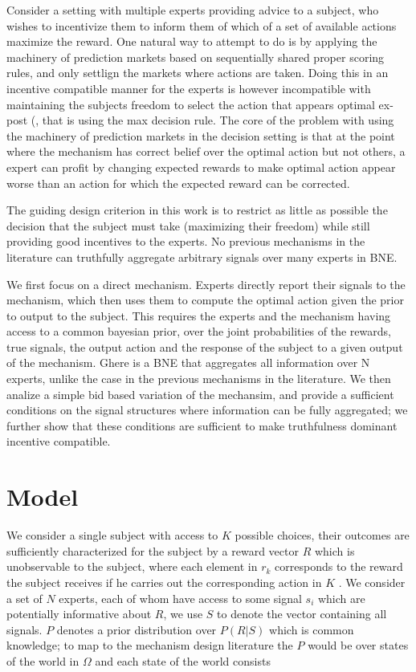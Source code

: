 
Consider a setting with multiple experts providing advice to a subject, who wishes to incentivize them to inform them of which of a set of available actions maximize the reward.
One natural way to attempt to do is by applying the machinery of prediction markets based on sequentially shared proper scoring rules, and only settlign the markets where actions are taken. Doing this in an incentive compatible manner for the experts is however incompatible with maintaining the subjects freedom to select the action that appears optimal ex-post (\cite{othman2010decision,  chen2014eliciting}, that is using the max decision rule. 
The core of the problem with using the machinery of prediction markets in the decision setting is that at the point where the mechanism has correct belief over the optimal action but not others, a expert  can profit by changing expected rewards to make optimal action appear worse than an action for which the expected reward can be corrected.


The guiding design criterion in this work is to restrict as little as possible the decision that the subject must take (maximizing their freedom) while still providing good incentives to the experts. No previous mechanisms in the literature can truthfully aggregate arbitrary signals over many experts in BNE. 

We first focus on a direct mechanism. Experts directly report their signals to the mechanism, which then uses them to compute the optimal action given the prior to output to the subject. This requires  the experts and the mechanism having access to a common bayesian prior, over the joint probabilities of the rewards, true signals, the output action and the response of the subject to a given output of the mechanism. Ghere is a BNE that aggregates all information over N experts, unlike the case in the previous mechanisms in the literature.
We then analize a simple bid based variation of the mechansim, and provide a sufficient conditions on the signal structures where information can be fully aggregated; we further show that these conditions are sufficient to make truthfulness dominant incentive compatible.  



\section{Model}

We consider a single subject with access to $K$ possible choices, their outcomes are sufficiently characterized for the subject by a reward vector $R$ which is unobservable to the subject, where each element in $r_k$ corresponds to the reward the subject receives if he carries out the corresponding action in $K$ . We consider a set of $N$ experts, each of whom have access to some signal $s_i$ which are potentially informative about $R$, we use $S$ to denote the vector containing all signals.  $P$ denotes a prior distribution over $P(R|S) $ which is common knowledge; to map to the mechanism design literature the $P$ would be over states of the world in $\Omega$ and each state of the world consists


